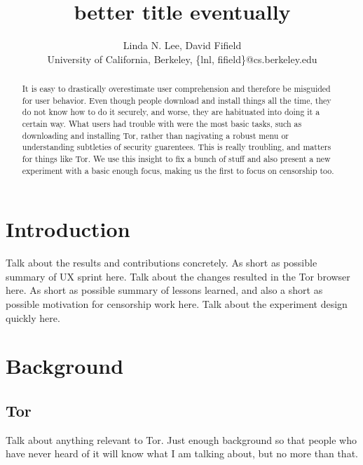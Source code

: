 \documentclass[letterpaper,twocolumn,10pt]{article}
\begin{document}
\title{better title eventually}
\author{Linda N. Lee, David Fifield\\
University of California, Berkeley, \{lnl, fifield\}@cs.berkeley.edu
}
\maketitle

\begin{abstract}
It is easy to drastically overestimate user comprehension 
and therefore be misguided for user behavior. 
Even though people download and install things all the time, 
they do not know how to do it securely, and worse, 
they are habituated into doing it a certain way. 
What users had trouble with were the most basic tasks, 
such as downloading and installing Tor, rather than 
nagivating a robust menu or understanding subtleties of security guarentees. 
This is really troubling, and matters for things like Tor. 
We use this insight to fix a bunch of stuff and also 
present a new experiment with a basic enough focus, 
making us the first to focus on censorship too. 
\end{abstract}

\section{Introduction} %
Talk about the results and contributions concretely.
As short as possible summary of UX sprint here. %
Talk about the changes resulted in the Tor browser here.
As short as possible summary of lessons learned, 
and also a short as possible motivation for censorship work here. %
Talk about the experiment design quickly here. 

\section{Background}  %

\subsection{Tor} 
Talk about anything relevant to Tor. Just enough background so
that people who have never heard of it will know what I am talking
about, but no more than that. 
\end{document}
